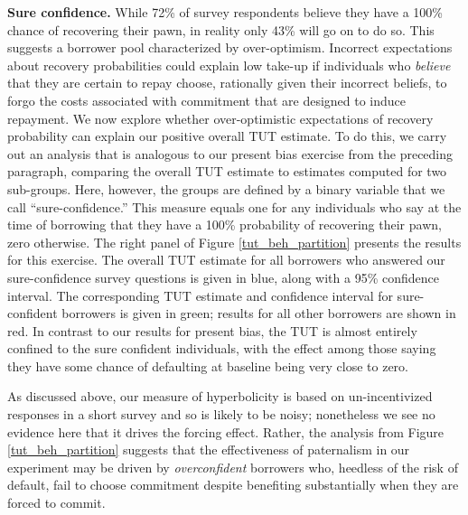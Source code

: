\documentclass[ecta,nameyear,final]{econsocart}
\begin{document}
\noindent \textbf{Sure confidence.} While 72\% of survey respondents believe they have a 100\% chance of recovering their pawn, in reality only 43\% will go on to do so.  
This suggests a borrower pool characterized by over-optimism.
Incorrect expectations about recovery probabilities could explain low take-up if individuals who \emph{believe} that they are certain to repay choose, rationally given their incorrect beliefs, to forgo the costs associated with commitment that are designed to induce repayment. 
We now explore whether over-optimistic expectations of recovery probability can explain our positive overall TUT estimate.
To do this, we carry out an analysis that is analogous to our present bias exercise from the preceding paragraph, comparing the overall TUT estimate to estimates computed for two sub-groups.
Here, however, the groups are defined by a binary variable that we call ``sure-confidence.''
This measure equals one for any individuals who say at the time of borrowing that they have a 100\% probability of recovering their pawn, zero otherwise.
The right panel of Figure \ref{tut_beh_partition} presents the results for this exercise.
The overall TUT estimate for all borrowers who answered our sure-confidence survey questions is given in blue, along with a 95\% confidence interval.
The corresponding TUT estimate and confidence interval for sure-confident borrowers is given in green; results for all other borrowers are shown in red.
In contrast to our results for present bias, the TUT is almost entirely confined to the sure confident individuals, with the effect among those saying they have some chance of defaulting at baseline being very close to zero.  

As discussed above, our measure of hyperbolicity is based on un-incentivized responses in a short survey and so is likely to be noisy; nonetheless we see no evidence here that it drives the forcing effect.  Rather, the analysis from Figure \ref{tut_beh_partition} suggests that the effectiveness of paternalism in our experiment may be driven by \emph{overconfident} borrowers who, heedless of the risk of default, fail to choose commitment despite benefiting substantially when they are forced to commit. 

\end{document}
